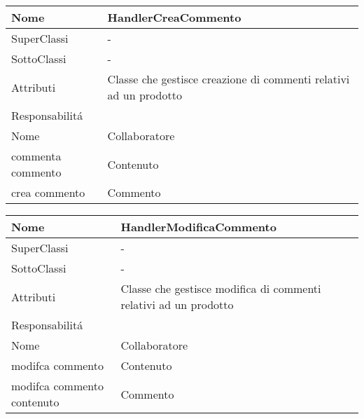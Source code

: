 \begin{center}
    \begin{tabular}{ |p{3cm}|p{3cm}|p{3cm}|p{3cm}| }
        \hline
        Nome & \multicolumn{3}{|p{9cm}|}{HandlerCreaCommento} \\\hline
        SuperClassi & \multicolumn{3}{|p{9cm}|}{-} \\\hline
        SottoClassi & \multicolumn{3}{|p{9cm}|}{-} \\\hline
        Attributi & \multicolumn{3}{|p{9cm}|}{Classe che gestisce creazione di commenti relativi ad un prodotto} \\\hline
        \multicolumn{4}{|p{12cm}|}{Responsabilit\'a} \\\hline
        \multicolumn{2}{|p{6cm}|}{Nome} & \multicolumn{2}{|p{6cm}|}{Collaboratore} \\\hline
        \multicolumn{2}{|p{6cm}|}{commenta commento} & \multicolumn{2}{|p{6cm}|}{Contenuto} \\\hline
        \multicolumn{2}{|p{6cm}|}{crea commento} & \multicolumn{2}{|p{6cm}|}{Commento} \\\hline
    \end{tabular}
\end{center}

\begin{center}
    \begin{tabular}{ |p{3cm}|p{3cm}|p{3cm}|p{3cm}| }
        \hline
        Nome & \multicolumn{3}{|p{9cm}|}{HandlerModificaCommento} \\\hline
        SuperClassi & \multicolumn{3}{|p{9cm}|}{-} \\\hline
        SottoClassi & \multicolumn{3}{|p{9cm}|}{-} \\\hline
        Attributi & \multicolumn{3}{|p{9cm}|}{Classe che gestisce modifica di commenti relativi ad un prodotto} \\\hline
        \multicolumn{4}{|p{12cm}|}{Responsabilit\'a} \\\hline
        \multicolumn{2}{|p{6cm}|}{Nome} & \multicolumn{2}{|p{6cm}|}{Collaboratore} \\\hline
        \multicolumn{2}{|p{6cm}|}{modifca commento} & \multicolumn{2}{|p{6cm}|}{Contenuto} \\\hline
        \multicolumn{2}{|p{6cm}|}{modifca commento contenuto} & \multicolumn{2}{|p{6cm}|}{Commento} \\\hline
    \end{tabular}
\end{center}

